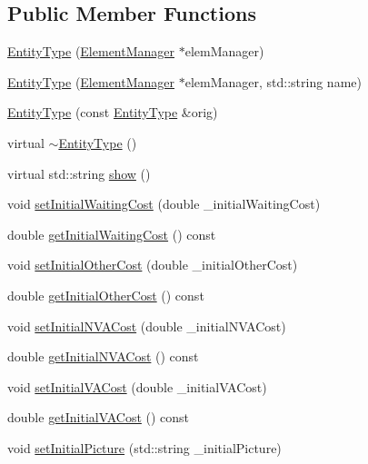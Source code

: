\subsection*{Public Member Functions}
\begin{DoxyCompactItemize}
\item 
\hyperlink{class_entity_type_aad6252c3ff73df057822a8e6f78d0736}{Entity\+Type} (\hyperlink{class_element_manager}{Element\+Manager} $\ast$elem\+Manager)
\item 
\hyperlink{class_entity_type_acdbf39a5a5b55adccc845cbf9d1f0363}{Entity\+Type} (\hyperlink{class_element_manager}{Element\+Manager} $\ast$elem\+Manager, std\+::string name)
\item 
\hyperlink{class_entity_type_a34b9576e2453ed309c75840319bbb2f8}{Entity\+Type} (const \hyperlink{class_entity_type}{Entity\+Type} \&orig)
\item 
virtual \hyperlink{class_entity_type_aee11e4242d000965f06018723bdf0946}{$\sim$\+Entity\+Type} ()
\item 
virtual std\+::string \hyperlink{class_entity_type_ab5a696912b12a9f51decded90f368dea}{show} ()
\item 
void \hyperlink{class_entity_type_affd1d2dd13149ae0989aae5cc9ea1e05}{set\+Initial\+Waiting\+Cost} (double \+\_\+initial\+Waiting\+Cost)
\item 
double \hyperlink{class_entity_type_a46dd0977b19bf167eeb12db97464b757}{get\+Initial\+Waiting\+Cost} () const 
\item 
void \hyperlink{class_entity_type_a32f126822c567a887a446a763db13d64}{set\+Initial\+Other\+Cost} (double \+\_\+initial\+Other\+Cost)
\item 
double \hyperlink{class_entity_type_ac5708811f5f6eaf7ac587fc88190b7f2}{get\+Initial\+Other\+Cost} () const 
\item 
void \hyperlink{class_entity_type_a935cac67adc2b13aa25290c3db04c847}{set\+Initial\+N\+V\+A\+Cost} (double \+\_\+initial\+N\+V\+A\+Cost)
\item 
double \hyperlink{class_entity_type_ae8b26deba82e687d5a07b863f750baf4}{get\+Initial\+N\+V\+A\+Cost} () const 
\item 
void \hyperlink{class_entity_type_aecd52de7178bb03be55798378d15d3e8}{set\+Initial\+V\+A\+Cost} (double \+\_\+initial\+V\+A\+Cost)
\item 
double \hyperlink{class_entity_type_a9833d4a85dcb5c5bd9db02e1e2e45dd9}{get\+Initial\+V\+A\+Cost} () const 
\item 
void \hyperlink{class_entity_type_ab3a19031f9b46b376bdd35aa3044c90e}{set\+Initial\+Picture} (std\+::string \+\_\+initial\+Picture)

\end{DoxyCompactItemize}

